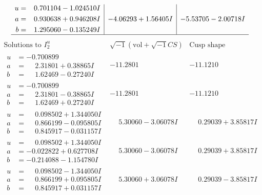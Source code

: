\documentclass[1p]{elsarticle_modified}
\theoremstyle{definition}
\newcommand{\I}{\sqrt{-1}}
\begin{document}
$$\begin{array}{c|c|c}
\begin{aligned}
u &= \phantom{-}0.701104 - 1.024510 I \\
a &= \phantom{-}0.930638 + 0.946208 I \\
b &= \phantom{-}1.295060 - 0.135249 I\end{aligned}
 & -4.06293 + 1.56405 I & -5.53705 - 2.00718 I\\
 \hline 
 \end{array}$$\newpage$$\begin{array}{c|c|c}  
\text{Solutions to }I^u_{2}& \I (\text{vol} + \sqrt{-1}CS) & \text{Cusp shape}\\
 \hline 
\begin{aligned}
u &= -0.700899\phantom{ +0.000000I} \\
a &= \phantom{-}2.31801 + 0.38865 I \\
b &= \phantom{-}1.62469 - 0.27240 I\end{aligned}
 & -11.2801\phantom{ +0.000000I} & -11.1210\phantom{ +0.000000I} \\ \hline\begin{aligned}
u &= -0.700899\phantom{ +0.000000I} \\
a &= \phantom{-}2.31801 - 0.38865 I \\
b &= \phantom{-}1.62469 + 0.27240 I\end{aligned}
 & -11.2801\phantom{ +0.000000I} & -11.1210\phantom{ +0.000000I} \\ \hline\begin{aligned}
u &= \phantom{-}0.098502 + 1.344050 I \\
a &= \phantom{-}0.866199 - 0.095805 I \\
b &= \phantom{-}0.845917 - 0.031157 I\end{aligned}
 & \phantom{-}5.30060 - 3.06078 I & \phantom{-}0.29039 + 3.85817 I \\ \hline\begin{aligned}
u &= \phantom{-}0.098502 + 1.344050 I \\
a &= -0.022822 + 0.627708 I \\
b &= -0.214088 - 1.154780 I\end{aligned}
 & \phantom{-}5.30060 - 3.06078 I & \phantom{-}0.29039 + 3.85817 I \\ \hline\begin{aligned}
u &= \phantom{-}0.098502 - 1.344050 I \\
a &= \phantom{-}0.866199 + 0.095805 I \\
b &= \phantom{-}0.845917 + 0.031157 I\end{aligned}
 & \phantom{-}5.30060 + 3.06078 I & \phantom{-}0.29039 - 3.85817 I \\ \hline\begin{aligned}

\end{aligned}
\end{array}$$
\end{document}
